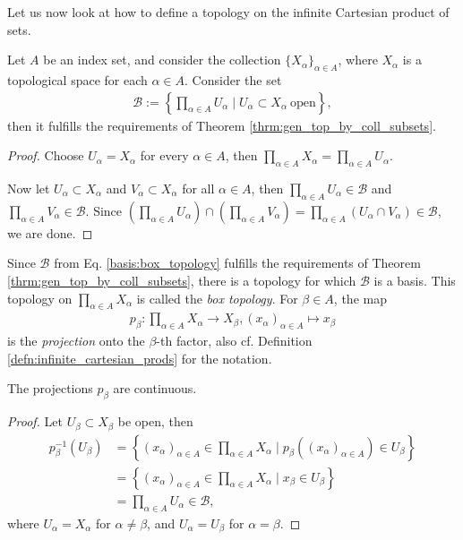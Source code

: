 Let us now look at how to define a topology on the infinite Cartesian product of sets.

\begin{theorem}
	Let $A$ be an index set, and consider the collection $\{X_{\alpha}\}_{\alpha\in A}$, where $X_{\alpha}$ is a topological space for each $\alpha\in A$. Consider the set
	\begin{align}\label{basis:box_topology}
		\mathscr B := \left\{ \prod_{\alpha\in A}U_{\alpha}\mid U_{\alpha}\subset X_{\alpha}\ \text{open} \right\},
	\end{align}
	then it fulfills the requirements of Theorem \ref{thrm:gen_top_by_coll_subsets}.
\end{theorem}

\begin{proof}
	Choose $U_{\alpha} = X_{\alpha}$ for every $\alpha\in A$, then $\prod_{\alpha\in A}X_{\alpha} = \prod_{\alpha\in A}U_{\alpha}$.
	
	Now let $U_{\alpha}\subset X_{\alpha}$ and $V_{\alpha}\subset X_{\alpha}$ for all $\alpha\in A$, then $\prod_{\alpha\in A}U_{\alpha}\in \mathscr B$ and $\prod_{\alpha\in A}V_{\alpha}\in \mathscr B$. Since $\left(\prod_{\alpha\in A}U_{\alpha}\right) \cap \left(\prod_{\alpha\in A}V_{\alpha}\right) = \prod_{\alpha\in A}\left(U_{\alpha}\cap V_{\alpha}\right)\in\mathscr B$, we are done.
\end{proof}

\begin{defn}
	Since $\mathscr B$ from Eq. \eqref{basis:box_topology} fulfills the requirements of Theorem \ref{thrm:gen_top_by_coll_subsets}, there is a topology for which $\mathscr B$ is a basis. This topology on $\prod_{\alpha\in A}X_{\alpha}$ is called the \textit{box topology}. For $\beta\in A$, the map 
	\begin{align}\label{eq:projection_box_topology}
		p_{\beta}: \prod_{\alpha\in A}X_{\alpha}\to X_{\beta}, (x_\alpha)_{\alpha\in A}\mapsto x_{\beta}
	\end{align} is the \textit{projection} onto the $\beta$-th factor, also cf. Definition \ref{defn:infinite_cartesian_prods} for the notation.
\end{defn}

\begin{remark}\label{remark:projections_inf_Cart_prod_continuous}
	The projections $p_{\beta}$ are continuous.
\end{remark}

\begin{proof}
	Let $U_{\beta}\subset X_{\beta}$ be open, then
	\begin{align*}
		p_{\beta}^{-1}(U_\beta) &= \left\{ (x_{\alpha})_{\alpha\in A}\in \prod_{\alpha\in A}X_{\alpha}\mid p_{\beta}\left((x_{\alpha})_{\alpha\in A}\right)\in U_{\beta} \right\} 
		\\ &= \left\{ (x_{\alpha})_{\alpha\in A}\in \prod_{\alpha\in A}X_{\alpha}\mid x_{\beta}\in U_{\beta} \right\}
		\\ &= \prod_{\alpha\in A}U_{\alpha}\in \mathscr B,
	\end{align*}
	where $U_{\alpha} = X_{\alpha}$ for $\alpha\ne\beta$, and $U_{\alpha} = U_{\beta}$ for $\alpha= \beta$.
\end{proof}

